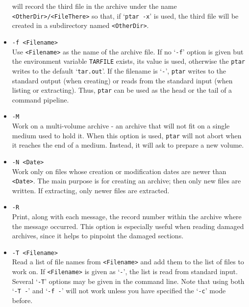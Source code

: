 \begin{itemize}
        will record the third file in the archive under the name 
        {\tt <OtherDir>/<FileThere>} so that, if `{\tt ptar -x}' is used, the
        third file will be created in a subdirectory named {\tt <OtherDir>}.

  \item {\tt -f <Filename>} \\
        Use {\tt <Filename>} as the name of the archive file. If no `{\tt -f}'
        option is given but the environment variable {\tt TARFILE} exists, its 
        value is used, otherwise the {\tt ptar} writes to the default 
        `{\tt tar.out}'. If the filename is `{\tt -}', {\tt ptar} writes to
        the standard output (when creating) or reads from the standard input 
        (when listing or extracting). Thus, {\tt ptar} can be used as the 
        head or the tail of a command pipeline.

  \item {\tt -M} \\
        Work on a multi-volume archive - an archive that will not fit on a 
        single medium used to hold it. When this option is used, {\tt ptar} 
        will not abort when it reaches the end of a medium. Instead, it will 
        ask to prepare a new volume.

  \item {\tt -N <Date>} \\
        Work only on files whose creation or modification dates are newer than 
        {\tt <Date>}. The main purpose is for creating an archive; then only 
        new files are written. If extracting, only newer files are extracted. 

  \item {\tt -R} \\
        Print, along with each message, the record number within the archive 
        where the message occurred. This option is especially useful when 
        reading damaged archives, since it helps to pinpoint the damaged 
        sections.

  \item {\tt -T <Filename>} \\
        Read a list of file names from {\tt <Filename>} and add them to the 
        list of files to work on. If {\tt <Filename>} is given as `{\tt -}',
        the list is read from standard input. Several `{\tt -T}' options may
        be given in the command line. Note that using both `{\tt -T -}' and
        `{\tt -f -}' will not work unless you have specified the `{\tt -c}'
        mode before.


\end{itemize}
